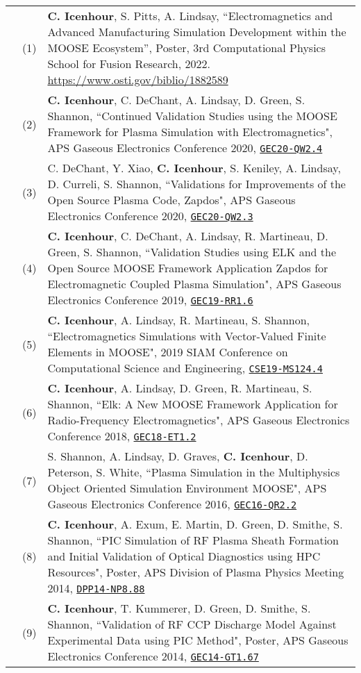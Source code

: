 \documentclass{article}
\begin{document}
	\begin{tabularx}{\textwidth}{l l X}
		\hspace{2em}
			& (1)  & \textbf{C. Icenhour}, S. Pitts, A. Lindsay, ``Electromagnetics and Advanced Manufacturing Simulation Development within the MOOSE Ecosystem'', Poster, 3rd Computational Physics School for Fusion Research, 2022. \url{https://www.osti.gov/biblio/1882589} \\
            & (2)  & \textbf{C. Icenhour}, C. DeChant, A. Lindsay, D. Green, S. Shannon, ``Continued Validation Studies using the MOOSE Framework for Plasma Simulation with Electromagnetics", APS Gaseous Electronics Conference 2020, \href{https://meetings.aps.org/Meeting/GEC20/Session/QW2.4}{\texttt{GEC20-QW2.4}} \\
            & (3)  & C. DeChant, Y. Xiao, \textbf{C. Icenhour}, S. Keniley, A. Lindsay, D. Curreli, S. Shannon, ``Validations for Improvements of the Open Source Plasma Code, Zapdos", APS Gaseous Electronics Conference 2020, \href{https://meetings.aps.org/Meeting/GEC20/Session/QW2.3}{\texttt{GEC20-QW2.3}} \\
			& (4)  & \textbf{C. Icenhour}, C. DeChant, A. Lindsay, R. Martineau, D. Green, S. Shannon, ``Validation Studies using ELK and the Open Source MOOSE Framework Application Zapdos for Electromagnetic Coupled Plasma Simulation", APS Gaseous Electronics Conference 2019, \href{http://meetings.aps.org/Meeting/GEC19/Session/RR1.6}{\texttt{GEC19-RR1.6}} \\
			& (5)  & \textbf{C. Icenhour}, A. Lindsay, R. Martineau, S. Shannon, ``Electromagnetics Simulations with Vector-Valued Finite Elements in MOOSE", 2019 SIAM Conference on Computational Science and Engineering, \href{http://meetings.siam.org/sess/dsp_talk.cfm?p=96892}{\texttt{CSE19-MS124.4}} \\
			& (6)  & \textbf{C. Icenhour}, A. Lindsay, D. Green, R. Martineau, S. Shannon, ``Elk: A New MOOSE Framework Application for Radio-Frequency Electromagnetics", APS Gaseous Electronics Conference 2018, \href{http://meetings.aps.org/link/BAPS.2018.GEC.ET1.2}{\texttt{GEC18-ET1.2}} \\
			& (7)  &  S. Shannon, A. Lindsay, D. Graves, \textbf{C. Icenhour}, D. Peterson, S. White, ``Plasma Simulation in the Multiphysics Object Oriented Simulation Environment MOOSE", APS Gaseous Electronics Conference 2016, \href{http://meetings.aps.org/link/BAPS.2016.GEC.QR2.2}{\texttt{GEC16-QR2.2}} \\
			& (8)  & \textbf{C. Icenhour}, A. Exum, E. Martin, D. Green, D. Smithe, S. Shannon, ``PIC Simulation of RF Plasma Sheath Formation and Initial Validation of Optical Diagnostics using HPC Resources", Poster, APS Division of Plasma Physics Meeting 2014, \href{http://meetings.aps.org/link/BAPS.2014.DPP.NP8.88}{\texttt{DPP14-NP8.88}} \\
			& (9)  & \textbf{C. Icenhour}, T. Kummerer, D. Green, D. Smithe, S. Shannon, ``Validation of RF CCP Discharge Model Against Experimental Data using PIC Method", Poster, APS Gaseous Electronics Conference 2014, \href{http://meetings.aps.org/link/BAPS.2014.GEC.GT1.67}{\texttt{GEC14-GT1.67}}
	\end{tabularx}
\end{document}
